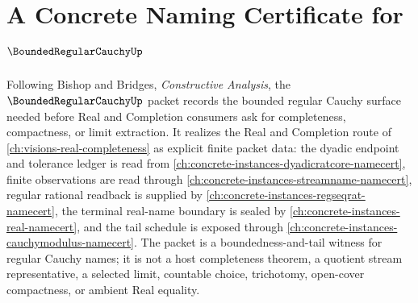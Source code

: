 \chapter{A Concrete Naming Certificate for $\BoundedRegularCauchyUp$}
\label{ch:concrete-instances-bounded-regular-cauchy-namecert}

Following Bishop and Bridges, \emph{Constructive Analysis}, the $\BoundedRegularCauchyUp$ packet records the bounded regular Cauchy surface needed before Real and Completion consumers ask for completeness, compactness, or limit extraction. It realizes the Real and Completion route of \autoref{ch:visions-real-completeness} as explicit finite packet data: the dyadic endpoint and tolerance ledger is read from \autoref{ch:concrete-instances-dyadicratcore-namecert}, finite observations are read through \autoref{ch:concrete-instances-streamname-namecert}, regular rational readback is supplied by \autoref{ch:concrete-instances-regseqrat-namecert}, the terminal real-name boundary is sealed by \autoref{ch:concrete-instances-real-namecert}, and the tail schedule is exposed through \autoref{ch:concrete-instances-cauchymodulus-namecert}. The packet is a boundedness-and-tail witness for regular Cauchy names; it is not a host completeness theorem, a quotient stream representative, a selected limit, countable choice, trichotomy, open-cover compactness, or ambient Real equality.


